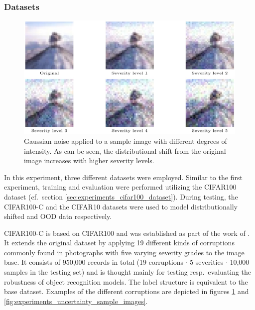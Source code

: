 \subsubsection{Datasets%
               \label{sec:experiments_uncertainty_dataset}}

\begin{figure}[tb]
    \centering
	    \includegraphics[width=\textwidth]{thesis/graphics/images/cifar100_c_severities_gaussian_noise.jpg}
    \caption{Gaussian noise applied to a sample image with different degrees of intensity. As can be seen, the distributional shift from the original image increases with higher severity levels.}
    \label{fig:experiments_uncertainty_severities_gaussian_noise}
\end{figure}

In this experiment, three different datasets were employed. Similar to the first experiment, training and evaluation were performed utilizing the CIFAR100 dataset (cf.\ section \ref{sec:experiments_cifar100_dataset}). During testing, the CIFAR100-C and the CIFAR10 datasets were used to model distributionally shifted and OOD data respectively.

CIFAR100-C is based on CIFAR100 and was established as part of the work of \cite{Hendrycks2019-gi}. It extends the original dataset by applying 19 different kinds of corruptions commonly found in photographs with five varying severity grades to the image base. It consists of 950,000 records in total (19 corruptions $\cdot$ 5 severities $\cdot$ 10,000 samples in the testing set) and is thought mainly for testing resp.\ evaluating the robustness of object recognition models. The label structure is equivalent to the base dataset. Examples of the different corruptions are depicted in figures \ref{fig:experiments_uncertainty_severities_gaussian_noise} and \ref{fig:experiments_uncertainty_sample_images}.

